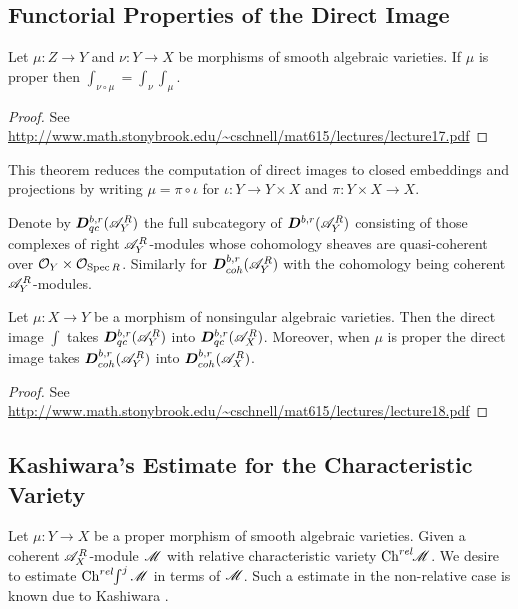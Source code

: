     \subsection{Functorial Properties of the Direct Image}
    \begin{theorem}
       Let $\mu:Z\to Y$ and $\nu:Y\to X$ be morphisms of smooth algebraic varieties. If $\mu$ is proper then $\int_{\nu\circ \mu} = \int_\nu \int_\mu$.
    \end{theorem}
    \begin{proof}
      See \url{http://www.math.stonybrook.edu/~cschnell/mat615/lectures/lecture17.pdf}
    \end{proof}
    This theorem reduces the computation of direct images to closed embeddings and projections by writing $\mu = \pi \circ \iota$ for $\iota:Y\to Y\times X$ and $\pi:Y\times X\to X$.



    Denote by $\boldsymbol{D}^{b,r}_{qc}(\mathscr{A}_Y^{R})$ the full subcategory of $\boldsymbol{D}^{b,r}(\mathscr{A}_Y^R)$ consisting of those complexes of right $\mathscr{A}_Y^R$-modules whose cohomology sheaves are quasi-coherent over $\mathcal{O}_Y\times \mathcal{O}_{\operatorname{Spec} R}$. Similarly for $\boldsymbol{D}^{b,r}_{coh}(\mathscr{A}_Y^R)$ with the cohomology being coherent $\mathscr{A}_Y^R$-modules.
    \begin{theorem}\label{thm: ConservationQuasiCoherentAndCoherentIfProper}
        Let $\mu:X\to Y$ be a morphism of nonsingular algebraic varieties. Then the direct image $\int$ takes $\boldsymbol{D}^{b,r}_{qc}(\mathscr{A}_Y^{R})$ into $\boldsymbol{D}^{b,r}_{qc}(\mathscr{A}_X^{R})$. Moreover, when $\mu$ is proper the direct image takes $\boldsymbol{D}^{b,r}_{coh}(\mathscr{A}_Y^R)$ into $\boldsymbol{D}^{b,r}_{coh}(\mathscr{A}_X^R)$.
    \end{theorem}
    \begin{proof}
      See \url{http://www.math.stonybrook.edu/~cschnell/mat615/lectures/lecture18.pdf}
    \end{proof}
\subsection{Kashiwara's Estimate for the Characteristic Variety}
Let $\mu:Y\to X$ be a proper morphism of smooth algebraic varieties. Given a coherent $\mathscr{A}_X^R$-module $\mathscr{M}$ with relative characteristic variety $\operatorname{Ch}^{rel}\mkern-5mu \mathscr{M}$. We desire to estimate $\operatorname{Ch}^{rel}\mkern-5mu \int^j \mathscr{M}$ in terms of $\mathscr{M}$. Such a estimate in the non-relative case is known due to Kashiwara \cite{kashiwara1976b}. %

